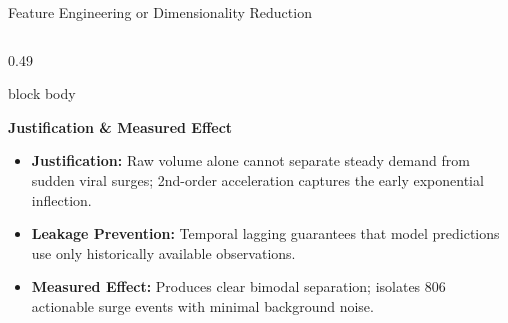 \documentclass[aspectratio=169, 10pt]{beamer}
\newenvironment{card}[1][]{%
    \begin{beamercolorbox}[rounded=true,shadow=false,wd=\linewidth,sep=4pt,#1]{block body}%
}{%
    \end{beamercolorbox}%
}
\begin{document}
\begin{frame}{Feature Engineering or Dimensionality Reduction}
\begin{columns}[T]
        \begin{column}{0.49\textwidth}
            \begin{card}
                {\fontsize{8.5pt}{10pt}\selectfont \textbf{\color{NavyPrimary}Justification \& Measured Effect}}\\[0.08cm]
                \begin{itemize}\setlength{\itemsep}{2pt}
                    \item \textbf{Justification:} Raw volume alone cannot separate steady demand from sudden viral surges; 2nd-order acceleration captures the early exponential inflection.
                    \item \textbf{Leakage Prevention:} Temporal lagging guarantees that model predictions use only historically available observations.
                    \item \textbf{Measured Effect:} Produces clear bimodal separation; isolates 806 actionable surge events with minimal background noise.
                \end{itemize}
            \end{card}
        \end{column}
    \end{columns}
\end{frame}
\end{document}
